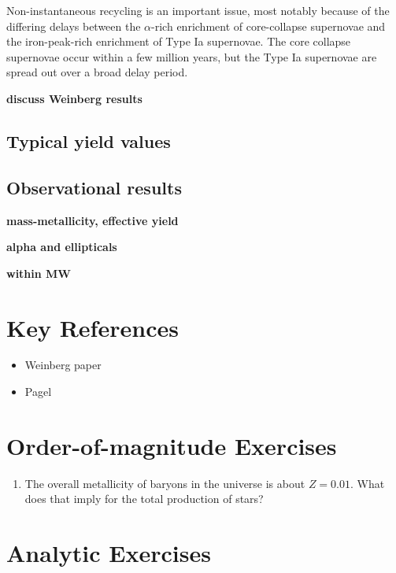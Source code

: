 Non-instantaneous recycling is an important issue, most notably
because of the differing delays between the $\alpha$-rich enrichment
of core-collapse supernovae and the iron-peak-rich  enrichment of Type
Ia supernovae. The core collapse supernovae occur within a few million
years, but the Type Ia supernovae are spread out over a broad delay
period. 

{\bf discuss Weinberg results}

\subsection{Typical yield values}

\subsection{Observational results}

{\bf mass-metallicity, effective yield}

{\bf alpha and ellipticals}

{\bf within MW}


\section{Key References}

\begin{itemize}
  \item Weinberg paper
  \item Pagel
\end{itemize}

\section{Order-of-magnitude Exercises}

\begin{enumerate} 
\item The overall metallicity of baryons in the universe is
 about $Z=0.01$.  What does that imply for the total production of
 stars?
\end{enumerate}   

\section{Analytic Exercises}

